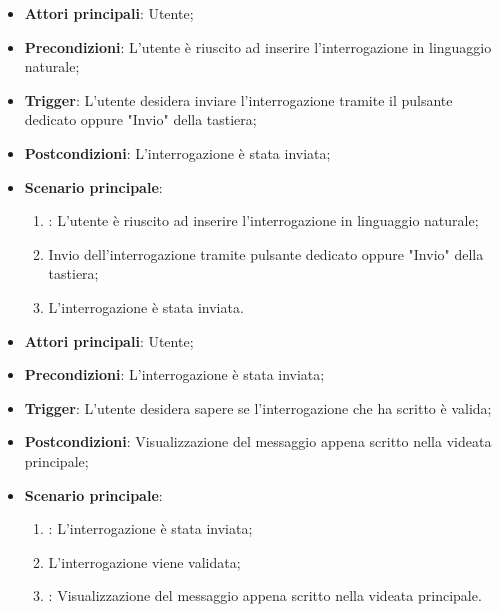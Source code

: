 \hypertarget{UC1.2}{}
\begin{itemize}
    \item \textbf{Attori principali}: Utente;
    \item \textbf{Precondizioni}: L'utente è riuscito ad inserire l'interrogazione in linguaggio naturale;
    \item \textbf{Trigger}: L'utente desidera inviare l'interrogazione tramite il pulsante dedicato oppure "Invio" della tastiera;
    \item \textbf{Postcondizioni}: L'interrogazione è stata inviata;
    \item \textbf{Scenario principale}:
    \begin{enumerate}
        \item {}: L'utente è riuscito ad inserire l'interrogazione in linguaggio naturale;
        \item Invio dell'interrogazione tramite pulsante dedicato oppure "Invio" della tastiera;
        \item L'interrogazione è stata inviata.
    \end{enumerate}
\end{itemize}

\hypertarget{UC1.3}{}
\begin{itemize}
    \item \textbf{Attori principali}: Utente;
    \item \textbf{Precondizioni}: L'interrogazione è stata inviata;
    \item \textbf{Trigger}: L'utente desidera sapere se l'interrogazione che ha scritto è valida;
    \item \textbf{Postcondizioni}: Visualizzazione del messaggio appena scritto nella videata principale;
    \item \textbf{Scenario principale}:
    \begin{enumerate}
        \item {}: L'interrogazione è stata inviata;
        \item L'interrogazione viene validata;
        \item {}: Visualizzazione del messaggio appena scritto nella videata principale.
    \end{enumerate}
\end{itemize}

